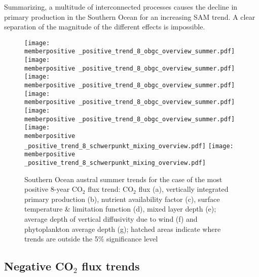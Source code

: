 \documentclass[12pt]{article}
\newcommand{\memberpositive}{m178_1985_1992} %
\begin{document}
Summarizing, a multitude of interconnected processes causes the decline in primary production in the Southern Ocean for an increasing SAM trend. A clear separation of the magnitude of the different effects is impossible.
 

\begin{figure}[h!] %
	\texttt{[image: \\memberpositive \_positive\_trend\_8\_obgc\_overview\_summer.pdf]} %
	\texttt{[image: \\memberpositive \_positive\_trend\_8\_obgc\_overview\_summer.pdf]} %
	\texttt{[image: \\memberpositive \_positive\_trend\_8\_obgc\_overview\_summer.pdf]} %
	\texttt{[image: \\memberpositive \_positive\_trend\_8\_obgc\_overview\_summer.pdf]} %
	\texttt{[image: \\memberpositive \_positive\_trend\_8\_obgc\_overview\_summer.pdf]} %
	\texttt{[image: \\memberpositive \_positive\_trend\_8\_schwerpunkt\_mixing\_overview.pdf]} %
	\texttt{[image: \\memberpositive \_positive\_trend\_8\_schwerpunkt\_mixing\_overview.pdf]} %

	\caption{Southern Ocean austral summer trends for the case of the most positive 8-year CO$_2$ flux trend: CO$_2$ flux (a), vertically integrated primary production (b), nutrient availability factor (c), surface temperature \& limitation function (d), mixed layer depth (e); average depth of vertical diffusivity due to wind (f) and phytoplankton average depth (g); hatched areas indicate where trends are outside the 5\% significance level}
	\label{fig:summer_trends_pos}
\end{figure}



\clearpage



\subsection{Negative CO$_2$ flux trends}
\label{sec:trends_neg}
\end{document}
